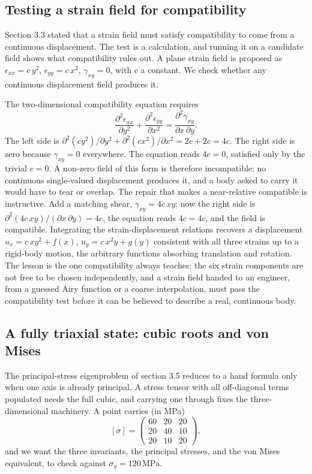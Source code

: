 \subsection{Testing a strain field for compatibility}

Section 3.3 stated that a strain field must satisfy compatibility to come
from a continuous displacement. The test is a calculation, and running it
on a candidate field shows what compatibility rules out. A plane strain
field is proposed as $\epsilon_{xx} = c\,y^2$, $\epsilon_{yy} = c\,x^2$,
$\gamma_{xy} = 0$, with $c$ a constant. We check whether any continuous
displacement field produces it.

The two-dimensional compatibility equation requires
\[
\frac{\partial^2 \epsilon_{xx}}{\partial y^2} + \frac{\partial^2
\epsilon_{yy}}{\partial x^2} = \frac{\partial^2 \gamma_{xy}}{\partial x
\,\partial y}.
\]
The left side is $\partial^2(c y^2)/\partial y^2 + \partial^2(c x^2)/
\partial x^2 = 2c + 2c = 4c$. The right side is zero because $\gamma_{xy}
= 0$ everywhere. The equation reads $4c = 0$, satisfied only by the
trivial $c = 0$. A non-zero field of this form is therefore
incompatible: no continuous single-valued displacement produces it, and a
body asked to carry it would have to tear or overlap. The repair that
makes a near-relative compatible is instructive. Add a matching shear,
$\gamma_{xy} = 4c\,xy$; now the right side is $\partial^2(4c\,xy)/
(\partial x\,\partial y) = 4c$, the equation reads $4c = 4c$, and the
field is compatible. Integrating the strain-displacement relations
recovers a displacement $u_x = c\,x y^2 + f(x)$, $u_y = c\,x^2 y + g(y)$
consistent with all three strains up to a rigid-body motion, the
arbitrary functions absorbing translation and rotation. The lesson is the
one compatibility always teaches: the six strain components are not free
to be chosen independently, and a strain field handed to an engineer,
from a guessed Airy function or a coarse interpolation, must pass the
compatibility test before it can be believed to describe a real,
continuous body.

\subsection{A fully triaxial state: cubic roots and von Mises}

The principal-stress eigenproblem of section 3.5 reduces to a hand
formula only when one axis is already principal. A stress tensor with all
off-diagonal terms populated needs the full cubic, and carrying one
through fixes the three-dimensional machinery. A point carries (in MPa)
\[
[\sigma] = \begin{pmatrix} 60 & 20 & 20 \\ 20 & 40 & 10 \\ 20 & 10 & 20
\end{pmatrix},
\]
and we want the three invariants, the principal stresses, and the von
Mises equivalent, to check against $\sigma_y = 120\,\text{MPa}$.

